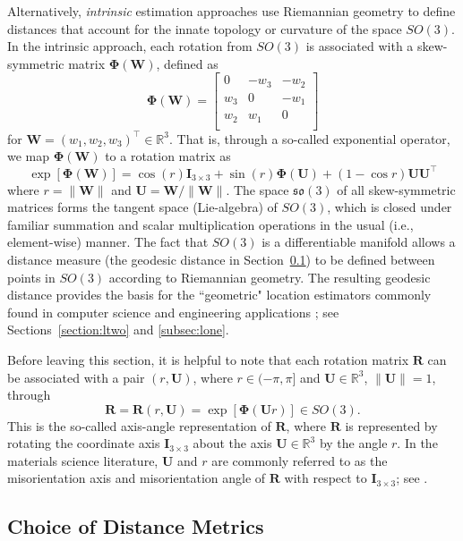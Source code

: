 Alternatively, \textit{intrinsic} estimation approaches use Riemannian geometry to define distances that account for the innate topology or curvature of the space $SO(3)$.  In the intrinsic approach, each rotation from $SO(3)$ is
associated with a skew-symmetric matrix $\bm{\Phi}(\bm{W})$, defined  as
\[
  \bm{\Phi}(\bm{W}) = \left[ \begin{array}{ccc} 0 & -w_3 & -w_2\\
  w_3 & 0 & -w_1\\
  w_2 & w_1 & 0\\
  \end{array}
 \right]
\]
for $\bm{W}=(w_1, w_2, w_3)^\top \in \mathbb{R}^3$. That is, through a so-called exponential operator,
we map  $\bm{\Phi}(\bm{W})$ to a rotation matrix as
\[
  \exp[\bm{\Phi}(\bm{W})] = \cos(r)\bm{I}_{3\times3} + \sin(r) \bm{\Phi}(\bm{U}) + (1-\cos r) \bm{U} \bm{U}^\top
\]
where $r=\|\bm{W}\|$ and $\bm{U} =\bm{W}/\|\bm{W}\| $.  The space $\mathfrak{so}(3)$ of all skew-symmetric matrices forms the tangent space (Lie-algebra) of $SO(3)$, which is closed under familiar summation and scalar multiplication operations in the usual (i.e., element-wise) manner. The fact that $SO(3)$ is a differentiable manifold allows a distance measure (the geodesic distance in Section~\ref{subsec:metrics}) to be defined between points in $SO(3)$ according to Riemannian geometry. The resulting geodesic distance provides the basis for the ``geometric" location estimators commonly found in computer science \citep{fletcher08, fletcher09, hartley11} and engineering applications \citep{manton04}; see Sections~\ref{section:ltwo} and \ref{subsec:lone}.

Before leaving this section, it is helpful to note that each rotation matrix $\bm{R}$ can be associated with a
pair $(r,\bm{U})$, where $r\in(-\pi,\pi]$ and $\bm{U}\in\mathbb{R}^3$, $\|\bm{U}\|=1$, through
\begin{equation}
\label{eqn:angleaxis}
 \bm{R} = \bm{R}(r,\bm{U}) = \exp[\bm\Phi(\bm{U} r)] \in SO(3).
\end{equation}
This is the so-called axis-angle representation of $\bm{R}$, where $\bm{R}$ is represented by rotating the coordinate axis $\bm{I}_{3 \times 3}$ about the axis $\bm{U}\in\mathbb{R}^3$ by the angle $r$. In the materials science literature,
$\bm{U}$ and $r$ are commonly referred to as the misorientation axis and misorientation angle of $\bm R$ with respect to  $\bm{I}_{3 \times 3}$; see \cite{randle03}.


\subsection{Choice of Distance Metrics}\label{subsec:metrics}

